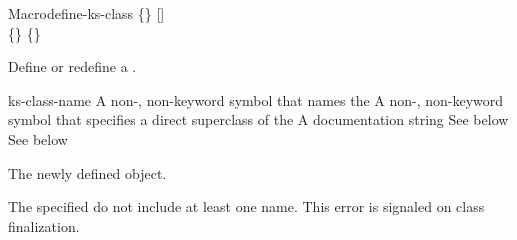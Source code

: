 \documentclass[10pt,twoside,english,pdftex]{article}
\begin{document}

\begin{functiondoc}{Macro}{define-ks-class}%
   { 
   \code{(}\{\}\superstar\code{)}
   [] \\
   \code{(}\{\}\superstar\code{)}
   \{\}\superstar{} \returns{}
   }
%
%
%

\fnsyntax

\fnpurpose Define or redefine a .

\fnpackage {}

\fnmodule {}

\fnargs
\begin{args}{ks-class-name}
 A non-\nil, non-keyword symbol that names the
 A non-\nil, non-keyword symbol that specifies a
direct superclass of the    
\arg[documentation] A documentation string
 See below
 See below
\end{args}

\fnreturns The newly defined  object.

\fnerrors The specified  do not include at least
one  name.  This error is signaled on class finalization.


\end{functiondoc}
\end{document}
